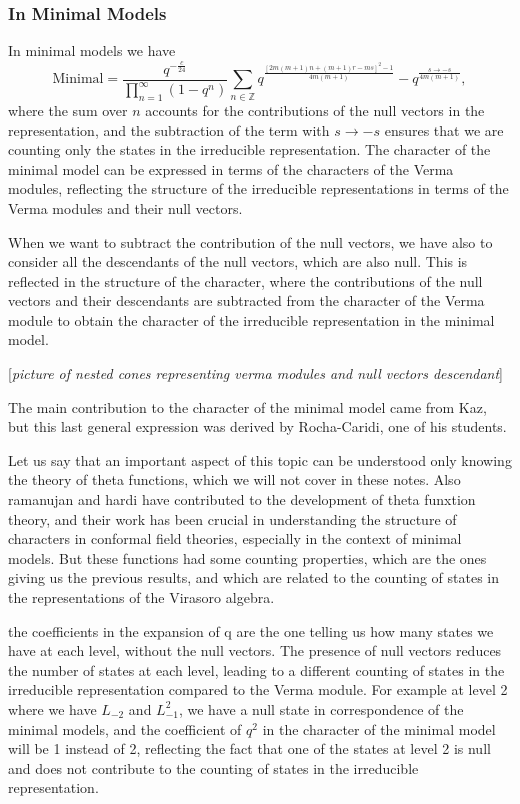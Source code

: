 \subsubsection{In Minimal Models}

In minimal models we have
\[
    \mathrm{Minimal} = \frac{q^{-\frac{c}{24}}}{\prod_{n=1}^\infty (1 - q^n)} \sum_{n \in \mathbb{Z}} q^{\frac{[2m(m+1)n + (m+1)r - ms]^2 - 1}{4m(m+1)}} - q^{\frac{s \to -s}{4m(m+1)}},
\]
where the sum over \(n\) accounts for the contributions of the null vectors in the representation, and the subtraction of the term with \(s \to -s\) ensures that we are counting only the states in the irreducible representation. The character of the minimal model can be expressed in terms of the characters of the Verma modules, reflecting the structure of the irreducible representations in terms of the Verma modules and their null vectors.

When we want to subtract the contribution of the null vectors, we have also to consider all the descendants of the null vectors, which are also null. This is reflected in the structure of the character, where the contributions of the null vectors and their descendants are subtracted from the character of the Verma module to obtain the character of the irreducible representation in the minimal model.

    [\textit{picture of nested cones representing verma modules and null vectors descendant}]

The main contribution to the character of the minimal model came from Kaz, but this last general expression was derived by Rocha-Caridi, one of his students.

Let us say that an important aspect of this topic can be understood only knowing the theory of theta functions, which we will not cover in these notes. Also ramanujan and hardi have contributed to the development of theta funxtion theory, and their work has been crucial in understanding the structure of characters in conformal field theories, especially in the context of minimal models. But these functions had some counting properties, which are the ones giving us the previous results, and which are related to the counting of states in the representations of the Virasoro algebra.

the coefficients in the expansion of q are the one telling us how many states we have at each level, without the null vectors. The presence of null vectors reduces the number of states at each level, leading to a different counting of states in the irreducible representation compared to the Verma module. For example at level 2 where we have \(L_{-2}\) and \(L_{-1}^2\), we have a null state in correspondence of the minimal models, and the coefficient of \(q^2\) in the character of the minimal model will be 1 instead of 2, reflecting the fact that one of the states at level 2 is null and does not contribute to the counting of states in the irreducible representation.

